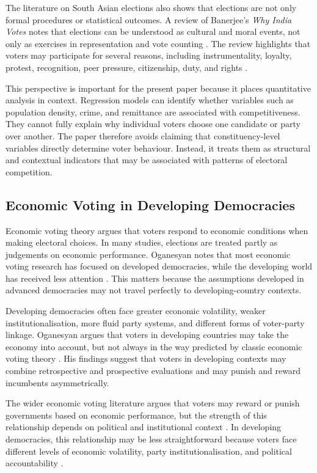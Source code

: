 \documentclass[12pt,a4paper]{article}
\begin{document}
The literature on South Asian elections also shows that elections are not only formal procedures or statistical outcomes. A review of Banerjee's \textit{Why India Votes} notes that elections can be understood as cultural and moral events, not only as exercises in representation and vote counting \citep{das2015}. The review highlights that voters may participate for several reasons, including instrumentality, loyalty, protest, recognition, peer pressure, citizenship, duty, and rights \citep{das2015}.

This perspective is important for the present paper because it places quantitative analysis in context. Regression models can identify whether variables such as population density, crime, and remittance are associated with competitiveness. They cannot fully explain why individual voters choose one candidate or party over another. The paper therefore avoids claiming that constituency-level variables directly determine voter behaviour. Instead, it treats them as structural and contextual indicators that may be associated with patterns of electoral competition.

\subsection{Economic Voting in Developing Democracies}

Economic voting theory argues that voters respond to economic conditions when making electoral choices. In many studies, elections are treated partly as judgements on economic performance. Oganesyan notes that most economic voting research has focused on developed democracies, while the developing world has received less attention \citep{oganesyan2014}. This matters because the assumptions developed in advanced democracies may not travel perfectly to developing-country contexts.

Developing democracies often face greater economic volatility, weaker institutionalisation, more fluid party systems, and different forms of voter-party linkage. Oganesyan argues that voters in developing countries may take the economy into account, but not always in the way predicted by classic economic voting theory \citep{oganesyan2014}. His findings suggest that voters in developing contexts may combine retrospective and prospective evaluations and may punish and reward incumbents asymmetrically.

The wider economic voting literature argues that voters may reward or punish governments based on economic performance, but the strength of this relationship depends on political and institutional context \citep{lewisbeck2000,duch2008}. In developing democracies, this relationship may be less straightforward because voters face different levels of economic volatility, party institutionalisation, and political accountability \citep{oganesyan2014}.
\end{document}
